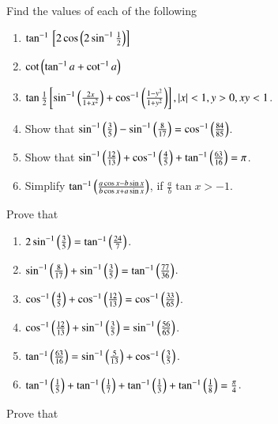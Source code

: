 Find the values of each of the following
\begin{enumerate}[label=\thesubsection.\arabic*,ref=\thesubsection.\theenumi,itemsep=1ex]
	\item 
		$\tan^{-1}{}\left[2\cos \left(2\sin^{-1}\frac{1}{2}\right)\right]$
	\item 
		$\cot\left(\tan^{-1}a + \cot^{-1}a\right)$
	\item
		$\tan\frac{1}{2}{}\left[\sin^{-1}\left(\frac{2x}{1+x^2}\right)+\cos^{-1}\left(\frac{1-y^2}{1+y^2}\right)\right],
		\left\vert x\right\vert < 1, y > 0,  xy < 1$.
\item 	Show that $\sin^{-1}\left(\frac{3}{5}\right)-\sin^{-1}\left(\frac{8}{17}\right)=\cos^{-1}\left(\frac{84}{85}\right)$.
\item 	Show that $\sin^{-1}\left(\frac{12}{13}\right)+\cos^{-1}\left(\frac{4}{5}\right)+\tan^{-1}\left(\frac{63}{16}\right)=\pi$.
	\item Simplify
		$\tan^{-1}\left(\frac{a\cos x-b\sin x}{b\cos x+a\sin x}\right)$, if $
\frac{a}{b}\tan x > -1$.
    
\end{enumerate}
Prove that
\begin{enumerate}[label=\thesubsection.\arabic*,ref=\thesubsection.\theenumi,resume*,itemsep=1ex]
	\item $2\sin^{-1}\left(\frac{3}{5}\right) = \tan^{-1}\left(\frac{24}{7}\right)$.
\item $\sin^{-1}\left(\frac{8}{17}\right) +\sin^{-1}\left(\frac{3}{5}\right) = \tan^{-1}\left(\frac{77}{36}\right)$.
\item $\cos^{-1}\left(\frac{4}{5}\right) +\cos^{-1}\left(\frac{12}{13}\right) = \cos^{-1}\left(\frac{33}{65}\right)$.
\item $\cos^{-1}\left(\frac{12}{13}\right) +\sin^{-1}\left(\frac{3}{5}\right) = \sin^{-1}\left(\frac{56}{65}\right)$.
\item $\tan^{-1}\left(\frac{63}{16}\right) =\sin^{-1}\left(\frac{5}{13}\right) + \cos^{-1}\left(\frac{3}{5}\right)$.
\item $\tan^{-1}\left(\frac{1}{5}\right) +\tan^{-1}\left(\frac{1}{7}\right) + \tan^{-1}\left(\frac{1}{3}\right)+ \tan^{-1}\left(\frac{1}{8}\right) = \frac{\pi}{4}$.
\end{enumerate}
Prove that
